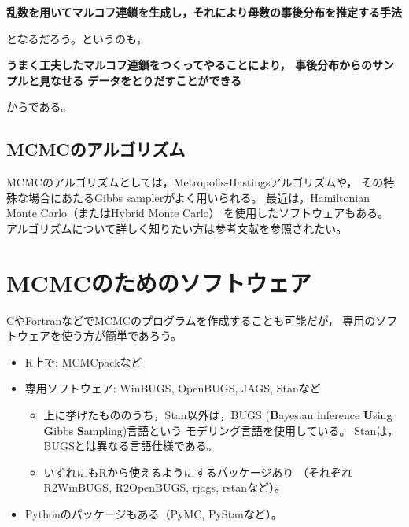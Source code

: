 \documentclass[11pt,uplatex]{jsarticle}
\begin{document}
\vspace{2zw}
\hspace{10mm}
\begin{minipage}{110mm}
\begin{breakbox}
\noindent
{\large\bf 乱数を用いてマルコフ連鎖を生成し，それにより母数の事後分布を推定する手法}
\end{breakbox}
\end{minipage}
\vspace{2zw}

\noindent
となるだろう。というのも，

\vspace{2zw}
\hspace{10mm}
\begin{minipage}{110mm}
\begin{breakbox}
\noindent
{\large\bf うまく工夫したマルコフ連鎖をつくってやることにより，
事後分布からのサンプルと見なせる
データをとりだすことができる}
\end{breakbox}
\end{minipage}
\vspace{2zw}

\noindent
からである。


\subsection{MCMCのアルゴリズム}

MCMCのアルゴリズムとしては，Metropolis-Hastingsアルゴリズムや，
その特殊な場合にあたるGibbs samplerがよく用いられる。\cite{PRML,Iba2005,Toyoda,Watanabe}
最近は，Hamiltonian Monte Carlo（またはHybrid Monte Carlo）
\cite{PRML,BDA3,Toyoda2015,Watanabe}
を使用したソフトウェアもある。
アルゴリズムについて詳しく知りたい方は参考文献を参照されたい。


\section{MCMCのためのソフトウェア}
CやFortranなどでMCMCのプログラムを作成することも可能だが，
専用のソフトウェアを使う方が簡単であろう。
\begin{itemize}
\item  \textsf{R}上で: MCMCpackなど
\item 専用ソフトウェア: \textsf{WinBUGS}, \textsf{OpenBUGS}, \textsf{JAGS}, \textsf{Stan}など
\begin{itemize}
 \item  上に挙げたもののうち，\textsf{Stan}以外は，BUGS (\textbf{B}ayesian inference \textbf{U}sing
 \textbf{G}ibbs \textbf{S}ampling)言語\cite{BUGSBook, BUGS}という
 モデリング言語を使用している。
 \label{BUGS}
\textsf{Stan}は，BUGSとは異なる言語仕様である。
\item  いずれにも\textsf{R}から使えるようにするパッケージあり
（それぞれ\textsf{R2WinBUGS}, \textsf{R2OpenBUGS}, \textsf{rjags}, \textsf{rstan}など）。
\end{itemize}
\item \textsf{Python}のパッケージもある（\textsf{PyMC}, \textsf{PyStan}など）。
\end{itemize}
\end{document}
